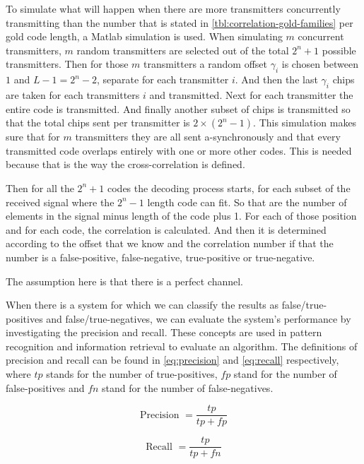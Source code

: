 		To simulate what will happen when there are more transmitters concurrently transmitting than the number that is stated in \autoref{tbl:correlation-gold-families} per gold code length, a Matlab simulation is used.
		When simulating $m$ concurrent transmitters, $m$ random transmitters are selected out of the total $2^n + 1$ possible transmitters.
		Then for those $m$ transmitters a random offset $\gamma_i$ is chosen between $1$ and $L - 1 = 2^n - 2$, separate for each transmitter $i$.
		And then the last $\gamma_i$ chips are taken for each transmitters $i$ and transmitted.
		Next for each transmitter the entire code is transmitted.
		And finally another subset of chips is transmitted so that the total chips sent per transmitter is $2 \times (2^n - 1)$.
		This simulation makes sure that for $m$ transmitters they are all sent a-synchronously and that every transmitted code overlaps entirely with one or more other codes.
		This is needed because that is the way the cross-correlation is defined.

		Then for all the $2^n +1$ codes the decoding process starts, for each subset of the received signal where the $2^n - 1$ length code can fit.
		So that are the number of elements in the signal minus length of the code plus 1.
		For each of those position and for each code, the correlation is calculated.
		And then it is determined according to the offset that we know and the correlation number if that the number is a false-positive, false-negative, true-positive or true-negative.

		The assumption here is that there is a perfect channel.
		
		When there is a system for which we can classify the results as false/true-positives and false/true-negatives, we can evaluate the system's performance by investigating the precision and recall.
		These concepts are used in pattern recognition and information retrieval to evaluate an algorithm.
		The definitions of precision and recall can be found in \autoref{eq:precision} and \autoref{eq:recall} respectively, where $tp$ stands for the number of true-positives, $fp$ stand for the number of false-positives and $fn$ stand for the number of false-negatives.

		\begin{equation}
			\label{eq:precision}
			\text{Precision } = \frac{tp}{tp + fp}
		\end{equation}

		\begin{equation}
			\label{eq:recall}
			\text{Recall } = \frac{tp}{tp + fn}
		\end{equation}

